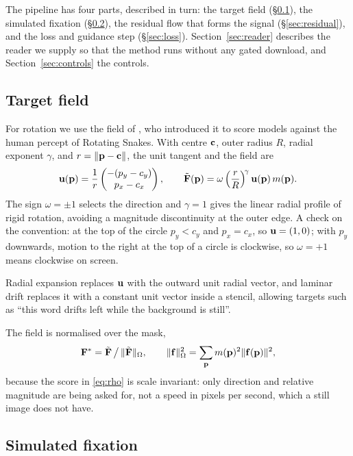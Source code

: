 The pipeline has four parts, described in turn: the target field
(\S\ref{sec:target}), the simulated fixation (\S\ref{sec:fixation}), the
residual flow that forms the signal (\S\ref{sec:residual}), and the loss and
guidance step (\S\ref{sec:loss}). Section~\ref{sec:reader} describes the reader
we supply so that the method runs without any gated download, and
Section~\ref{sec:controls} the controls.

\subsection{Target field}
\label{sec:target}

For rotation we use the field of \citet{rosario2026illusory}, who introduced it
to score models against the human percept of Rotating Snakes. With centre $\mathbf{c}$,
outer radius $R$, radial exponent $\gamma$, and $r=\lVert\mathbf{p}-\mathbf{c}\rVert$, the
unit tangent and the field are
\begin{equation}
\mathbf{u}(\mathbf{p})=\frac{1}{r}\begin{pmatrix}-(p_y-c_y)\\ p_x-c_x\end{pmatrix},
\qquad
\tilde{\mathbf{F}}(\mathbf{p})=\omega\left(\frac{r}{R}\right)^{\!\gamma}\mathbf{u}(\mathbf{p})\, m(\mathbf{p}).
\label{eq:rotation}
\end{equation}
The sign $\omega=\pm1$ selects the direction and $\gamma=1$ gives the linear
radial profile of rigid rotation, avoiding a magnitude discontinuity at the
outer edge. A check on the convention: at the top of the circle
$p_y<c_y$ and $p_x=c_x$, so $\mathbf{u}=(1,0)$; with $p_y$ downwards, motion to the
right at the top of a circle is clockwise, so $\omega=+1$ means clockwise on
screen.

Radial expansion replaces $\mathbf{u}$ with the outward unit radial vector, and
laminar drift replaces it with a constant unit vector inside a stencil,
allowing targets such as ``this word drifts left while the background is
still''.

The field is normalised over the mask,
\begin{equation}
\mathbf{F}^\ast=\tilde{\mathbf{F}}\,\big/\,\lVert\tilde{\mathbf{F}}\rVert_{\Omega},
\qquad
\lVert\mathbf{f}\rVert_{\Omega}^2=\sum_{\mathbf{p}}m(\mathbf{p})^2\lVert\mathbf{f}(\mathbf{p})\rVert^2 ,
\label{eq:normalise}
\end{equation}
because the score in \eqref{eq:rho} is scale invariant: only direction and
relative magnitude are being asked for, not a speed in pixels per second, which
a still image does not have.

\subsection{Simulated fixation}
\label{sec:fixation}

